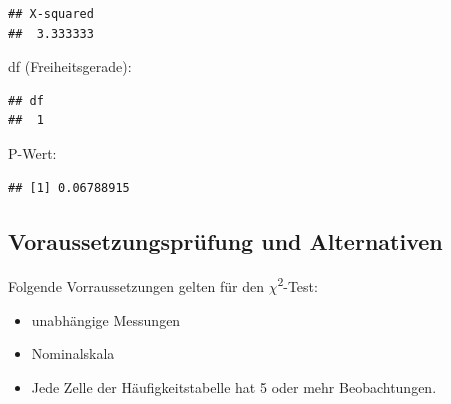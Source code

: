 \documentclass[
]{book}
\newenvironment{Shaded}{\begin{snugshade}}{\end{snugshade}}
\newcommand{\FunctionTok}[1]{\textcolor[rgb]{0.13,0.29,0.53}{\textbf{#1}}}
\newcommand{\NormalTok}[1]{#1}
\newcommand{\SpecialCharTok}[1]{\textcolor[rgb]{0.81,0.36,0.00}{\textbf{#1}}}
\providecommand{\tightlist}{%
  \setlength{\itemsep}{0pt}\setlength{\parskip}{0pt}}
\begin{document}
\begin{Shaded}
\end{Shaded}

\begin{verbatim}
## X-squared 
##  3.333333
\end{verbatim}

df (Freiheitsgerade):

\begin{Shaded}
\end{Shaded}

\begin{verbatim}
## df 
##  1
\end{verbatim}

P-Wert:

\begin{Shaded}
\end{Shaded}

\begin{verbatim}
## [1] 0.06788915
\end{verbatim}

\subsection{Voraussetzungsprüfung und Alternativen}\label{voraussetzungspruxfcfung-und-alternativen-2}

Folgende Vorraussetzungen gelten für den \(\chi\)\textsuperscript{2}-Test:

\begin{itemize}
\tightlist
\item
  unabhängige Messungen
\item
  Nominalskala
\item
  Jede Zelle der Häufigkeitstabelle hat 5 oder mehr Beobachtungen.
\end{itemize}
\end{document}

